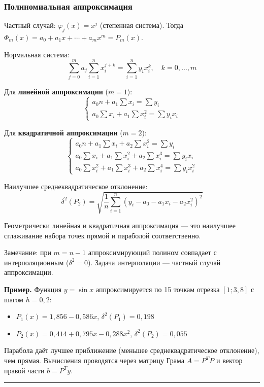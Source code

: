 \documentclass[14pt,a4paper]{extarticle}
\begin{document}
\subsubsection{Полиномиальная аппроксимация}

Частный случай: $\varphi_j(x) = x^j$ (степенная система). Тогда $\Phi_m(x) = a_0 + a_1 x + \cdots + a_m x^m = P_m(x)$.

Нормальная система:
\[\sum_{j=0}^{m} a_j \sum_{i=1}^{n} x_i^{j+k} = \sum_{i=1}^{n} y_i x_i^k, \quad k = 0, \ldots, m\]

Для \textbf{линейной аппроксимации} ($m = 1$):
\[\begin{cases} a_0 n + a_1 \sum x_i = \sum y_i \\ a_0 \sum x_i + a_1 \sum x_i^2 = \sum y_i x_i \end{cases}\]

Для \textbf{квадратичной аппроксимации} ($m = 2$):
\[\begin{cases} a_0 n + a_1 \sum x_i + a_2 \sum x_i^2 = \sum y_i \\ a_0 \sum x_i + a_1 \sum x_i^2 + a_2 \sum x_i^3 = \sum y_i x_i \\ a_0 \sum x_i^2 + a_1 \sum x_i^3 + a_2 \sum x_i^4 = \sum y_i x_i^2 \end{cases}\]

Наилучшее среднеквадратическое отклонение:
\[\delta^2(P_2) = \sqrt{\frac{1}{n}\sum_{i=1}^{n} (y_i - a_0 - a_1 x_i - a_2 x_i^2)^2}\]

Геометрически линейная и квадратичная аппроксимация --- это наилучшее сглаживание набора точек прямой и параболой соответственно.

Замечание: при $m = n - 1$ аппроксимирующий полином совпадает с интерполяционным ($\delta^2 = 0$). Задача интерполяции --- частный случай аппроксимации.

\textbf{Пример.} Функция $y = \sin x$ аппроксимируется по 15 точкам отрезка $[1; 3{,}8]$ с шагом $h = 0{,}2$:
\begin{itemize}
    \item $P_1(x) = 1{,}856 - 0{,}586x$, $\delta^2(P_1) = 0{,}198$
    \item $P_2(x) = 0{,}414 + 0{,}795x - 0{,}288x^2$, $\delta^2(P_2) = 0{,}055$
\end{itemize}

Парабола даёт лучшее приближение (меньшее среднеквадратическое отклонение), чем прямая. Вычисления проводятся через матрицу Грама $A = P^T P$ и вектор правой части $b = P^T y$.

\hrule\bigskip
\end{document}
